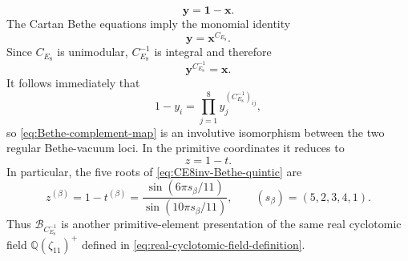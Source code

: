 \documentclass[11pt,a4paper]{article}
\numberwithin{equation}{section}
\begin{document}
\begin{equation}
  \boldsymbol y=\boldsymbol 1-\boldsymbol x.
  \label{eq:Bethe-complement-map}
\end{equation}
The Cartan Bethe equations imply the monomial identity
\begin{equation}
  \boldsymbol y=\boldsymbol x^{C_{E_8}}.
  \label{eq:Bethe-complement-monomial}
\end{equation}
Since $C_{E_8}$ is unimodular, $C_{E_8}^{-1}$ is integral and therefore
\begin{equation}
  \boldsymbol y^{C_{E_8}^{-1}}=\boldsymbol x.
\end{equation}
It follows immediately that
\begin{equation}
  1-y_i
  =\prod_{j=1}^{8}y_j^{(C_{E_8}^{-1})_{ij}},
\end{equation}
so \eqref{eq:Bethe-complement-map} is an involutive isomorphism between the two regular Bethe-vacuum loci.  In the primitive coordinates it reduces to
\begin{equation}
  z=1-t.
  \label{eq:Bethe-complement-primitive}
\end{equation}
In particular, the five roots of \eqref{eq:CE8inv-Bethe-quintic} are
\begin{equation}
  z^{(\beta)}
  =1-t^{(\beta)}
  =\frac{\sin(6\pi s_\beta/11)}{\sin(10\pi s_\beta/11)},
  \qquad
  (s_\beta)=(5,2,3,4,1).
  \label{eq:CE8inv-Bethe-roots-exact}
\end{equation}
Thus $\mathcal B_{C_{E_8}^{-1}}$ is another primitive-element presentation of the same real cyclotomic field $\mathbb Q(\zeta_{11})^+$ defined in \eqref{eq:real-cyclotomic-field-definition}.
\end{document}
